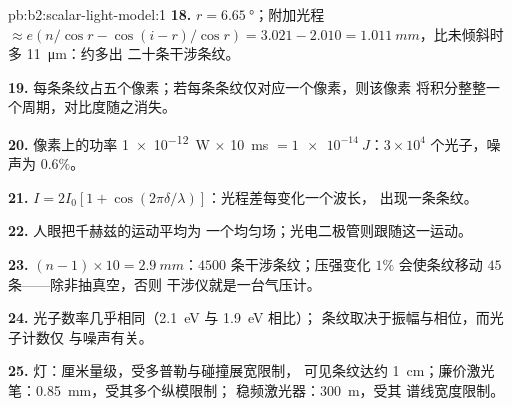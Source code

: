\begin{solution}{pb:b2:scalar-light-model:1}
\textbf{18.} $r = \qty{6.65}{\degree}$；附加光程 $\approx e(n/\cos r - \cos(i - r)/\cos r)
= 3.021 - 2.010 = \qty{1.011}{mm}$，比未倾斜时多 \qty{11}{\micro m}：约多出
二十条干涉条纹。

\textbf{19.} 每条条纹占五个像素；若每条条纹仅对应一个像素，则该像素
将积分整整一个周期，对比度随之消失。

\textbf{20.} 像素上的功率 \qty{1e-12}{W} $\times$ \qty{10}{ms} $= \qty{1e-14}{J}$：$3 \times 10^4$
个光子，噪声为 $0.6\%$。

\textbf{21.} $I = 2I_0[1 + \cos(2\pi\delta/\lambda)]$：光程差每变化一个波长，
出现一条条纹。

\textbf{22.} 人眼把千赫兹的运动平均为
一个均匀场；光电二极管则跟随这一运动。

\textbf{23.} $(n - 1) \times 10 = \qty{2.9}{mm}$：$4500$ 条干涉条纹；压强变化 $1\%$
会使条纹移动 $45$ 条——除非抽真空，否则
干涉仪就是一台气压计。

\textbf{24.} 光子数率几乎相同（\qty{2.1}{eV} 与 \qty{1.9}{eV} 相比）；
条纹取决于振幅与相位，而光子计数仅
与噪声有关。

\textbf{25.} 灯：厘米量级，受多普勒与碰撞展宽限制，
可见条纹达约 \qty{1}{cm}；廉价激光笔：\qty{0.85}{mm}，受其多个纵模限制；
稳频激光器：\qty{300}{m}，受其
谱线宽度限制。
\end{solution}
